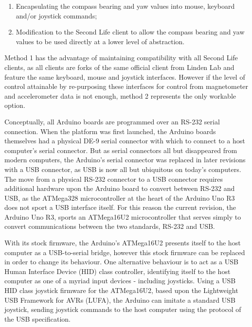 \begin{enumerate}
	\item Encapsulating the compass bearing and yaw values into mouse, keyboard and/or joystick commands;
	\item Modification to the Second Life client to allow the compass bearing and yaw values to be used directly at a lower level of abstraction.
\end{enumerate}

Method 1 has the advantage of maintaining compatibility with all Second Life clients, as all clients are forks of the same official client from Linden Lab and feature the same keyboard, mouse and joystick interfaces. However if the level of control attainable by re-purposing these interfaces for control from magnetometer and accelerometer data is not enough, method 2 represents the only workable option.

Conceptually, all Arduino boards are programmed over an RS-232 serial connection. When the platform was first launched, the Arduino boards themselves had a physical DE-9 serial connector with which to connect to a host computer's serial connector. But as serial connectors all but disappeared from modern computers, the Arduino's serial connector was replaced in later revisions with a USB connector, as USB is now all but ubiquitous on today's computers. The move from a physical RS-232 connector to a USB connector requires additional hardware upon the Arduino board to convert between RS-232 and USB, as the ATMega328\atmegaTFootnote{} microcontroller at the heart of the Arduino Uno R3 does not sport a USB interface itself. For this reason the current revision, the Arduino Uno R3, sports an ATMega16U2\atmegaFootnote{} microcontroller that serves simply to convert communications between the two standards, RS-232 and USB.

With its stock firmware, the Arduino's ATMega16U2 presents itself to the host computer as a USB-to-serial bridge, however this stock firmware can be replaced in order to change its behaviour. One alternative behaviour is to act as a USB Human Interface Device (HID) class controller, identifying itself to the host computer as one of a myriad input devices - including joysticks. Using a USB HID class joystick firmware for the ATMega16U2\arduinousbhidFootnote{}, based upon the Lightweight USB Framework for AVRs (LUFA)\lufaFootnote{}, the Arduino can imitate a standard USB joystick, sending joystick commands to the host computer using the protocol of the USB specification.

